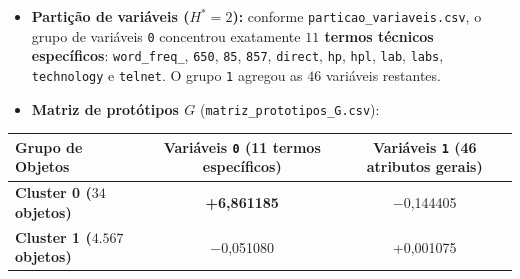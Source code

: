 \documentclass[a4paper,11pt]{article}
\begin{document}
\begin{itemize}[leftmargin=1.5em, itemsep=0.25em, topsep=0.25em]
  \item \textbf{Partição de variáveis ($H^* = 2$):} conforme \texttt{particao\_\allowbreak variaveis.csv}, o grupo de variáveis \texttt{0} concentrou exatamente \textbf{$11$ termos técnicos específicos}: \texttt{word\_\allowbreak freq\_}, \texttt{650}, \texttt{85}, \texttt{857}, \texttt{direct}, \texttt{hp}, \texttt{hpl}, \texttt{lab}, \texttt{labs}, \texttt{technology} e \texttt{telnet}. O grupo \texttt{1} agregou as $46$ variáveis restantes.
  \item \textbf{Matriz de protótipos $G$} (\texttt{matriz\_\allowbreak prototipos\_\allowbreak G.csv}):
\end{itemize}
\begin{center}
\begin{minipage}{\linewidth}
\centering
{}
\small
\setlength{\tabcolsep}{5pt}
\renewcommand{\arraystretch}{1.18}
\begin{tabular}{l c c}
\toprule
\textbf{Grupo de Objetos} & \textbf{Variáveis \texttt{0} (11 termos específicos)} & \textbf{Variáveis \texttt{1} (46 atributos gerais)} \\
\midrule
\textbf{Cluster 0 ($34$ objetos)} & \textbf{+6,861185} & $-$0,144405 \\
\textbf{Cluster 1 ($4.567$ objetos)} & $-$0,051080 & +0,001075 \\
\bottomrule
\end{tabular}
\end{minipage}
\end{center}
\end{document}
